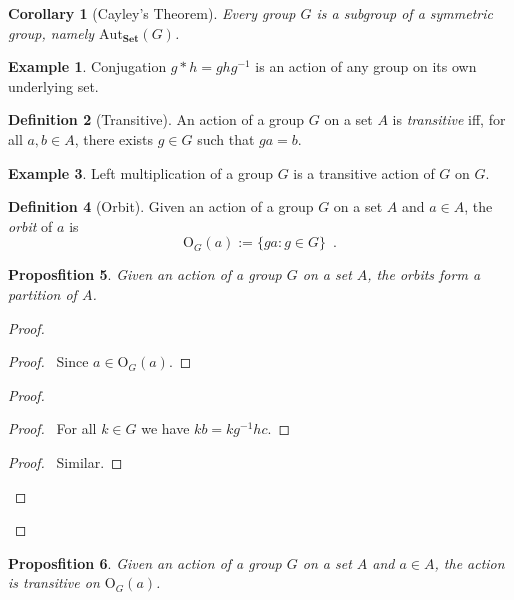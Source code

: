 \documentclass{book}
\let\qed\relax
\newtheorem{prop}{Proposfition}[chapter]
\newtheorem{cor}{Corollary}[prop]
\theoremstyle{definition}
\newtheorem{df}[prop]{Definition}
\newtheorem{ex}[prop]{Example}
\newcommand{\Aut}[2]{\ensuremath{\mathrm{Aut}_{#1} \left( {#2} \right)}}
\newcommand{\inv}[1]{\ensuremath{{#1}^{-1}}}
\newcommand{\Set}{\ensuremath{\mathbf{Set}}}
\begin{document}
\begin{cor}[Cayley's Theorem]
Every group $G$ is a subgroup of a symmetric group, namely $\Aut{\Set}{G}$.
\end{cor}

\begin{ex}
Conjugation $g * h = gh\inv{g}$ is an action of any group on its own underlying set.
\end{ex}

\begin{df}[Transitive]
An action of a group $G$ on a set $A$ is \emph{transitive} iff, for all $a,b \in A$, there exists $g \in G$ such that $ga = b$.
\end{df}

\begin{ex}
Left multiplication of a group $G$ is a transitive action of $G$ on $G$.
\end{ex}

\begin{df}[Orbit]
Given an action of a group $G$ on a set $A$ and $a \in A$, the \emph{orbit} of $a$ is
\[ \mathrm{O}_G(a) := \{ ga : g \in G \} \enspace . \]
\end{df}

\begin{prop}
Given an action of a group $G$ on a set $A$, the orbits form a partition of $A$.
\end{prop}

\begin{proof}
\pf
{}
\begin{proof}
\pf\ Since $a \in \mathrm{O}_G(a)$.
\end{proof}
\begin{proof}
\begin{proof}
\pf\ For all $k \in G$ we have $kb = k\inv{g}hc$.
\end{proof}
\begin{proof}
\pf\ Similar.
\end{proof}
\end{proof}
\qed
\end{proof}

\begin{prop}
Given an action of a group $G$ on a set $A$ and $a \in A$, the action is transitive on $\mathrm{O}_G(a)$.
\end{prop}
\end{document}
